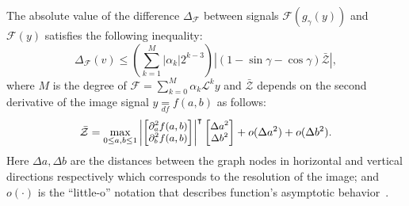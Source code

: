 \documentclass[10pt,journal,compsoc]{IEEEtran}
\newcommand{\df}{\mathop{=}\limits_{df}}
\newcommand{\norm}[1]{\left|#1\right|}
\begin{document}
\begin{theorem}

		The absolute value of the difference $\Delta_\mathcal{F}$ between signals $\mathcal{F}(g_\gamma (y))$ and $\mathcal{F}(y)$ satisfies the following inequality:
		\begin{equation}
		\Delta_\mathcal{F} (v) \leq \left(\sum_{k=1}^M \norm{\alpha_k} 2^{k-3} \right) \left| (1 - \sin\gamma - \cos\gamma) \bar{\mathcal{Z}} \right|,
		\label{eq:filt_diff_rot}
		\end{equation}
		\noindent
		where $M$ is the degree of $\mathcal{F} = \sum_{k=0}^M \alpha_k \mathcal{L}^k y$ and $\bar{\mathcal{Z}}$ depends on the second derivative of the image signal $y \df f(a,b)$ as follows:
		\begin{equation}
		\small
		\bar{\mathcal{Z}} =
		\max_{0 \leq a,b \leq 1} \left|
		\begin{bmatrix}
		\partial_a^2 f (a,b) \\
		\partial_b^2 f (a,b) \\
		\end{bmatrix}
		\right|^{\intercal}
		\begin{bmatrix}
		\Delta a^2 \\
		\Delta b^2 \\
		\end{bmatrix} + o(\Delta a^2) + o(\Delta b^2).
		\label{eq:sec_der}
		\end{equation}
		\noindent
		Here $\Delta a, \Delta b$ are the distances between the graph nodes in horizontal and vertical directions respectively which corresponds to the resolution of the image; and $o(\cdot)$ is the ``little-o'' notation that describes function's asymptotic behavior~\cite{bb:Landau09}.
		\label{t:im_rot}
	\end{theorem}
\end{document}
